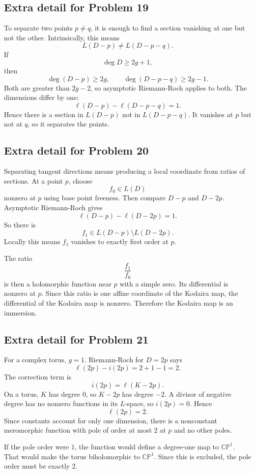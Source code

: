 \documentclass[11pt]{article}
\newcommand{\CP}{\mathbb{CP}}
\begin{document}
\subsection*{Extra detail for Problem 19}

To separate two points $p\neq q$, it is enough to find a section vanishing at one but not the other. Intrinsically, this means
\[
 L(D-p)\neq L(D-p-q).
\]
If
\[
 \deg D\geq2g+1,
\]
then
\[
 \deg(D-p)\geq2g,\qquad \deg(D-p-q)\geq2g-1.
\]
Both are greater than $2g-2$, so asymptotic Riemann-Roch applies to both. The dimensions differ by one:
\[
 \ell(D-p)-\ell(D-p-q)=1.
\]
Hence there is a section in $L(D-p)$ not in $L(D-p-q)$. It vanishes at $p$ but not at $q$, so it separates the points.

\subsection*{Extra detail for Problem 20}

Separating tangent directions means producing a local coordinate from ratios of sections. At a point $p$, choose
\[
 f_0\in L(D)
\]
nonzero at $p$ using base point freeness. Then compare $D-p$ and $D-2p$. Asymptotic Riemann-Roch gives
\[
 \ell(D-p)-\ell(D-2p)=1.
\]
So there is
\[
 f_1\in L(D-p)\setminus L(D-2p).
\]
Locally this means $f_1$ vanishes to exactly first order at $p$.

The ratio
\[
 \frac{f_1}{f_0}
\]
is then a holomorphic function near $p$ with a simple zero. Its differential is nonzero at $p$. Since this ratio is one affine coordinate of the Kodaira map, the differential of the Kodaira map is nonzero. Therefore the Kodaira map is an immersion.

\subsection*{Extra detail for Problem 21}

For a complex torus, $g=1$. Riemann-Roch for $D=2p$ says
\[
 \ell(2p)-i(2p)=2+1-1=2.
\]
The correction term is
\[
 i(2p)=\ell(K-2p).
\]
On a torus, $K$ has degree $0$, so $K-2p$ has degree $-2$. A divisor of negative degree has no nonzero functions in its $L$-space, so $i(2p)=0$. Hence
\[
 \ell(2p)=2.
\]
Since constants account for only one dimension, there is a nonconstant meromorphic function with pole of order at most $2$ at $p$ and no other poles.

If the pole order were $1$, the function would define a degree-one map to $\CP^1$. That would make the torus biholomorphic to $\CP^1$. Since this is excluded, the pole order must be exactly $2$.
\end{document}
